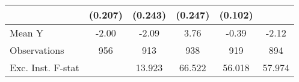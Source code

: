 {\begin{tabular}{l*{5}{c}}
            &     (0.207)         &     (0.243)         &     (0.247)         &     (0.102)         &                     \\
\midrule
Mean Y      &       -2.00         &       -2.09         &        3.76         &       -0.39         &       -2.12         \\
Observations&         956         &         913         &         938         &         919         &         894         \\
Exc. Inst. F-stat&                     &      13.923         &      66.522         &      56.018         &      57.974         \\
\bottomrule
\end{tabular}
}
